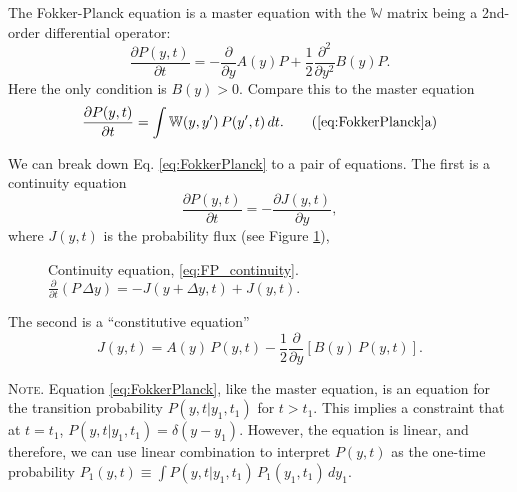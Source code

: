 \documentclass{book}
\numberwithin{equation}{section}
\theoremstyle{plain}
\theoremstyle{definition}
\theoremstyle{remark}
\theoremstyle{BoldStyle}
\numberwithin{exercise}{section}
\newcommand{\note}[1]{{\color{DarkGreen}\footnotesize \textsc{Note.} #1}}
\begin{document}
The Fokker-Planck equation is a master equation with
the $\mathbb W$ matrix being a 2nd-order differential operator:
%
\begin{equation}
  \frac{ \partial P(y, t) }  { \partial t }
=
-\frac{\partial } {\partial y} A(y) P
+\frac{1}{2} \frac{ \partial^2 } { \partial y^2 } B(y) P.
\label{eq:FokkerPlanck}
\end{equation}
Here the only condition is $B(y) > 0$.
Compare this to the master equation
\begin{equation}
\frac{ \partial P(y, t) } { \partial t }
=
\int \mathbb W(y, y') \, P(y', t) \, dt.
\tag{\ref{eq:FokkerPlanck}a}
\label{eq:master_W}
\end{equation}



We can break down Eq. \eqref{eq:FokkerPlanck}
to a pair of equations.
%
The first is a continuity equation
%
\begin{equation}
\frac{ \partial P(y, t) } { \partial t }
=
-\frac{ \partial J(y, t) } { \partial y },
\label{eq:FP_continuity}
\end{equation}
%
where $J(y, t)$ is the probability flux (see Figure \ref{fig:FP_continuity}),
\begin{figure}[h]
  \centering
  \label{fig:FP_continuity}
  \caption{
    Continuity equation, \eqref{eq:FP_continuity}.
    $\frac{ \partial } { \partial t } \left( P \, \Delta y \right) = -J(y+ \Delta y, t) + J(y, t).$
  }
\end{figure}
%
The second is a ``constitutive equation''
%
\begin{equation}
J(y, t)
=
A(y) \, P(y, t)
-
\frac{1}{2}
\frac{ \partial }{ \partial y }
\left[
  B(y) \, P(y, t)
\right].
\label{eq:FP_constitutive}
\end{equation}
%

\note{Equation \eqref{eq:FokkerPlanck},
like the master equation,
is an equation for the transition probability
$P(y, t|y_1, t_1)$ for $t > t_1$.
%
This implies a constraint that at $t = t_1$,
$P(y, t|y_1, t_1) = \delta(y - y_1)$.
%
However, the equation is linear,
and therefore, we can use linear combination
to interpret $P(y, t)$
as the one-time probability
$P_1(y, t) \equiv \int P(y, t|y_1, t_1) \, P_1(y_1, t_1) \, dy_1$.
}
\end{document}
